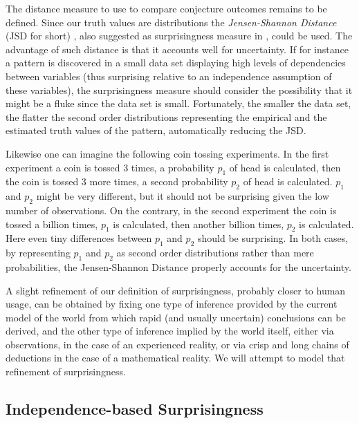 \documentclass[runningheads]{llncs}
\begin{document}
The distance measure to use to compare conjecture outcomes remains to
be defined. Since our truth values are distributions the
\emph{Jensen-Shannon Distance} (JSD for short) \cite{Endres2003A},
also suggested as surprisingness measure in \cite{Pienta2015AN,
  DerezinskiRH18}, could be used. The advantage of such distance is
that it accounts well for uncertainty. If for instance a pattern is
discovered in a small data set displaying high levels of dependencies
between variables (thus surprising relative to an independence
assumption of these variables), the surprisingness measure should
consider the possibility that it might be a fluke since the data set
is small. Fortunately, the smaller the data set, the flatter the
second order distributions representing the empirical and the
estimated truth values of the pattern, automatically reducing the JSD.

Likewise one can imagine the following coin tossing experiments. In
the first experiment a coin is tossed 3 times, a probability $p_1$ of
head is calculated, then the coin is tossed 3 more times, a second
probability $p_2$ of head is calculated. $p_1$ and $p_2$ might be very
different, but it should not be surprising given the low number of
observations. On the contrary, in the second experiment the coin is
tossed a billion times, $p_1$ is calculated, then another billion
times, $p_2$ is calculated. Here even tiny differences between $p_1$
and $p_2$ should be surprising. In both cases, by representing $p_1$
and $p_2$ as second order distributions rather than mere
probabilities, the Jensen-Shannon Distance properly accounts for the
uncertainty.

A slight refinement of our definition of surprisingness, probably
closer to human usage, can be obtained by fixing one type of inference
provided by the current model of the world from which rapid (and
usually uncertain) conclusions can be derived, and the other type of
inference implied by the world itself, either via observations, in the
case of an experienced reality, or via crisp and long chains of
deductions in the case of a mathematical reality. We will attempt to
model that refinement of surprisingness.

\subsection{Independence-based Surprisingness}
\label{IS}
\end{document}
